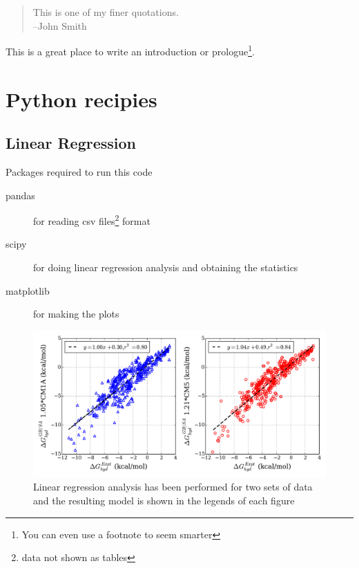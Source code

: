 \documentclass[oneside,11pt]{memoir} %
\begin{document}
\begin{quote}
This is one of my finer quotations.\\
--John Smith
\end{quote}

This is a great place to write an introduction or prologue\footnote{You can even use a footnote to seem smarter}.


\part{Python recipies}


\chapter{Linear Regression}
Packages required to run this code
\begin{description}
  \item[pandas] for reading csv files\footnote{data not shown as tables} format
  \item[scipy] for doing linear regression analysis and obtaining the statistics
  \item[matplotlib] for making the plots
\end{description}


\begin{figure}
\includegraphics[scale=0.3]{python_recipies/GBSA_comp.pdf}
\caption{Linear regression analysis has been performed for two sets of data and the resulting model is shown in the legends of each figure}
\end{figure}
\end{document}
